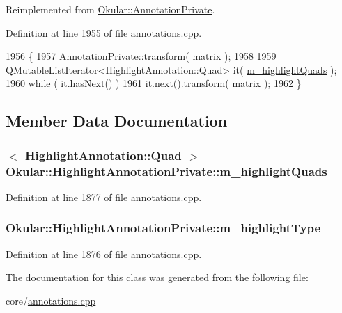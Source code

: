 Reimplemented from \hyperlink{classOkular_1_1AnnotationPrivate_a0d340a5ed89975edc173b72569f1e3f0}{Okular\+::\+Annotation\+Private}.



Definition at line 1955 of file annotations.\+cpp.


\begin{DoxyCode}
1956 \{
1957     \hyperlink{classOkular_1_1AnnotationPrivate_a0d340a5ed89975edc173b72569f1e3f0}{AnnotationPrivate::transform}( matrix );
1958 
1959     QMutableListIterator<HighlightAnnotation::Quad> it( \hyperlink{classOkular_1_1HighlightAnnotationPrivate_aa822b72c9bf0a2001ed17ce4bedb04f0}{m\_highlightQuads} );
1960     \textcolor{keywordflow}{while} ( it.hasNext() )
1961         it.next().transform( matrix );
1962 \}
\end{DoxyCode}


\subsection{Member Data Documentation}
\hypertarget{classOkular_1_1HighlightAnnotationPrivate_aa822b72c9bf0a2001ed17ce4bedb04f0}{
\subsubsection[{m\+\_\+highlight\+Quads}]{$<$ {\bf Highlight\+Annotation\+::\+Quad} $>$ Okular\+::\+Highlight\+Annotation\+Private\+::m\+\_\+highlight\+Quads}}\label{classOkular_1_1HighlightAnnotationPrivate_aa822b72c9bf0a2001ed17ce4bedb04f0}


Definition at line 1877 of file annotations.\+cpp.

\hypertarget{classOkular_1_1HighlightAnnotationPrivate_a9d5963335b5a637d21b5737250da329b}{
\subsubsection[{m\+\_\+highlight\+Type}]{ Okular\+::\+Highlight\+Annotation\+Private\+::m\+\_\+highlight\+Type}}\label{classOkular_1_1HighlightAnnotationPrivate_a9d5963335b5a637d21b5737250da329b}


Definition at line 1876 of file annotations.\+cpp.



The documentation for this class was generated from the following file\+:\begin{DoxyCompactItemize}
\item 
core/\hyperlink{annotations_8cpp}{annotations.\+cpp}\end{DoxyCompactItemize}
